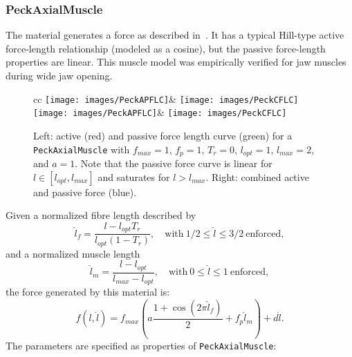 \subsubsection{PeckAxialMuscle}

The 
material generates a force as described in~\cite{peck2000dynamic}. 
It has a typical Hill-type active force-length relationship (modeled
as a cosine), but the passive force-length properties are linear. This
muscle model was empirically verified for jaw muscles during wide jaw
opening.

\begin{figure}[ht]
\begin{center}
\begin{tabular}{cc}
   \iflatexml
      \texttt{[image: images/PeckAPFLC]}&
      \texttt{[image: images/PeckCFLC]}
   \else
      \texttt{[image: images/PeckAPFLC]}&
      \texttt{[image: images/PeckCFLC]}
   \fi
\end{tabular}
\end{center}
\caption{Left: active (red) and passive force length curve (green)
for a {\tt PeckAxialMuscle} with $f_{max} = 1$, $f_{p} = 1$, $T_r =
0$, $l_{opt} = 1$, $l_{max} = 2$, and $a = 1$. Note that the passive
force curve is linear for $l \in [l_{opt}, l_{max}]$ and saturates for
$l > l_{max}$. Right: combined active and passive force (blue).}
\label{PeckCurves:fig}
\end{figure}

Given a normalized fibre length described by
%
\begin{equation}
\hat l_f = \frac{l - l_{opt} T_r}{l_{opt} (1 - T_r)}, 
\quad \mathrm{with}~ 1/2 \le \hat l \le 3/2~\mathrm{enforced},
\end{equation}
%
and a normalized muscle length 
%
\begin{equation}
\hat l_m = \frac{l - l_{opt}}{l_{max} - l_{opt}}, 
\quad \mathrm{with}~ 0 \le \hat l \le 1~\mathrm{enforced},
\end{equation}
%
the force generated by this material is:
%
\begin{equation}
f(l, \dot l) = 
f_{max} \left( a \frac{1 + \cos(2 \pi \hat l_f)}{2} +  f_{p} \hat l_m \right) + d \dot l.
\label{PeckAxialMuscle:eqn}
\end{equation}
%
The parameters are specified as properties of {\tt PeckAxialMuscle}:

